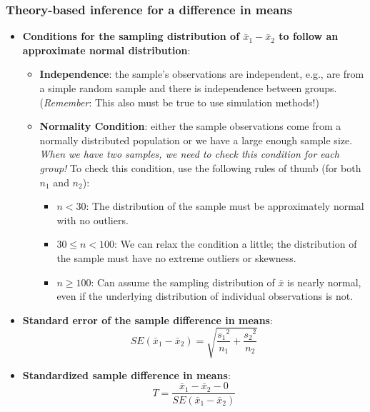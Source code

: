 \documentclass[
]{report}
\begin{document}
\subsubsection*{Theory-based inference for a difference in means}\label{theory-based-inference-for-a-difference-in-means}

\begin{itemize}
\item
  \textbf{Conditions for the sampling distribution of \(\bar{x}_1 - \bar{x}_2\) to follow an approximate normal distribution}:

  \begin{itemize}
  \item
    \textbf{Independence}: the sample's observations are independent, e.g., are from a simple random sample and there is independence between groups. (\emph{Remember}: This also must be true to use simulation methods!)
  \item
    \textbf{Normality Condition}: either the sample observations come from a normally distributed population or we have a large enough sample size. \emph{When we have two samples, we need to check this condition for each group!} To check this condition, use the following rules of thumb (for both \(n_1\) and \(n_2\)):

    \begin{itemize}
    \item
      \(n < 30\): The distribution of the sample must be approximately normal with no outliers.
    \item
      \(30 \le n < 100\): We can relax the condition a little; the distribution of the sample must have no extreme outliers or skewness.
    \item
      \(n \ge 100\): Can assume the sampling distribution of \(\bar{x}\) is nearly normal, even if the underlying distribution of individual observations is not.
    \end{itemize}
  \end{itemize}
\item
  \textbf{Standard error of the sample difference in means}:
  \[SE(\bar{x}_1 - \bar{x}_2) = \sqrt{\frac{{s_1}^2}{n_1}+\frac{{s_2}^2}{n_2}}\]
\item
  \textbf{Standardized sample difference in means}:
  \[T = \frac{\bar{x}_1-\bar{x}_2-0}{SE(\bar{x}_1 - \bar{x}_2)}\]


\end{itemize}
\end{document}
